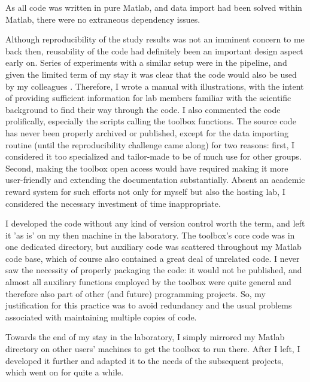As all code was written in pure Matlab, and data import had been solved within Matlab, there were no extraneous dependency issues.

Although reproducibility of the study results was not an imminent concern to me back then, reusability of the code had definitely been an important design aspect early on. Series of experiments with a similar setup were in the pipeline, and given the limited term of my stay it was clear that the code would also be used by my colleagues \cite{perouansky_amnesic_2007, hentschke_altered_2009, balakrishnan_midazolam_2014}. Therefore, I wrote a manual with illustrations, with the intent of providing sufficient information for lab members familiar with the scientific background to find their way through the code. I also commented the code prolifically, especially the scripts calling the toolbox functions. The source code has never been properly archived or published, except for the data importing routine (until the reproducibility challenge came along) for two reasons: first, I considered it too specialized and tailor-made to be of much use for other groups. Second, making the toolbox open access would have required making it more user-friendly and extending the documentation substantially. Absent an academic reward system for such efforts not only for myself but also the hosting lab, I considered the necessary investment of time inappropriate.

I developed the code without any kind of version control worth the term, and left it 'as is' on my then machine in the laboratory. The toolbox's core code was in one dedicated directory, but auxiliary code was scattered throughout my Matlab code base, which of course also contained a great deal of unrelated code. I never saw the necessity of properly packaging the code: it would not be published, and almost all auxiliary functions employed by the toolbox were quite general and therefore also part of other (and future) programming projects. So, my justification for this practice was to avoid redundancy and the usual problems associated with maintaining multiple copies of code.

Towards the end of my stay in the laboratory, I simply mirrored my Matlab directory on other users' machines to get the toolbox to run there. After I left, I developed it further and adapted it to the needs of the subsequent projects, which went on for quite a while. 

